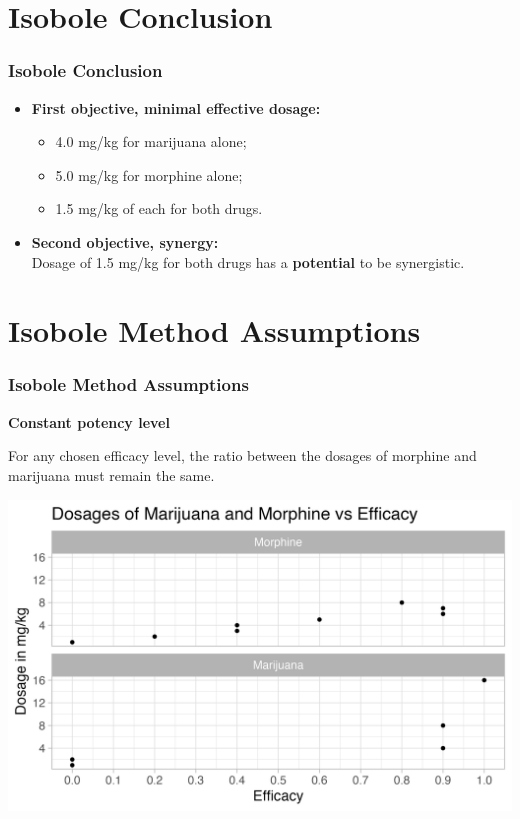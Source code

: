 \documentclass[14pt]{beamer}
\begin{document}
\section{Isobole Conclusion}
\begin{frame}
\frametitle{Isobole Conclusion}
\begin{itemize}[label={\checkmark}]
\item \textbf{First objective, minimal effective dosage:} \\
\begin{itemize}[label={$\blacktriangleright$}]
\item 4.0 mg/kg for marijuana alone;
\item 5.0 mg/kg for morphine alone;
\item 1.5 mg/kg of each for both drugs.
\end{itemize}
\item \textbf{Second objective, synergy:} \\
Dosage of 1.5 mg/kg for both drugs has a \textbf{potential} to be synergistic.
\end{itemize}
\end{frame}

\section{Isobole Method Assumptions}
\begin{frame}
\frametitle{Isobole Method Assumptions}
\textbf{Constant potency level}

For any chosen efficacy level, the ratio between the dosages of morphine and marijuana must remain the same.
\end{frame}

\begin{frame}
\includegraphics[scale=0.6]{potency_ratio.png}
\end{frame}
\end{document}
